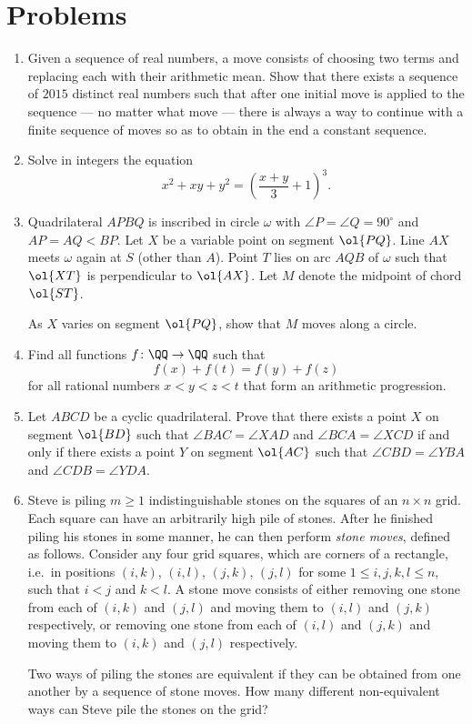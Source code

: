 \documentclass[11pt]{scrartcl}
\begin{document}
\section{Problems}
\begin{enumerate}[\bfseries 1.]
\item %
Given a sequence of real numbers,
a move consists of choosing two terms
and replacing each with their arithmetic mean.
Show that there exists a sequence of $2015$ distinct real numbers
such that after one initial move
is applied to the sequence --- no matter what move --- there
is always a way to continue with a finite sequence of moves
so as to obtain in the end a constant sequence.

\item %
Solve in integers the equation
\[ x^2+xy+y^2 = \left(\frac{x+y}{3}+1\right)^3. \]

\item %
Quadrilateral $APBQ$ is inscribed in circle $\omega$ with
$\angle P = \angle Q = 90^{\circ}$ and $AP = AQ < BP$.
Let $X$ be a variable point on segment $\ol{PQ}$.
Line $AX$ meets $\omega$ again at $S$ (other than $A$).
Point $T$ lies on arc $AQB$ of $\omega$ such that $\ol{XT}$
is perpendicular to $\ol{AX}$.
Let $M$ denote the midpoint of chord $\ol{ST}$.

As $X$ varies on segment $\ol{PQ}$, show that $M$ moves along a circle.

\item %
Find all functions $f \colon \QQ \to \QQ$ such that
\[ f(x)+f(t)=f(y)+f(z) \]
for all rational numbers $x<y<z<t$ that form an arithmetic progression.

\item %
Let $ABCD$ be a cyclic quadrilateral.
Prove that there exists a point $X$ on segment $\ol{BD}$
such that $\angle BAC=\angle XAD$ and $\angle BCA=\angle XCD$
if and only if there exists a point $Y$ on segment $\ol{AC}$
such that $\angle CBD=\angle YBA$ and $\angle CDB=\angle YDA$.

\item %
Steve is piling $m\geq 1$ indistinguishable stones
on the squares of an $n\times n$ grid.
Each square can have an arbitrarily high pile of stones.
After he finished piling his stones in some manner,
he can then perform \emph{stone moves}, defined as follows.
Consider any four grid squares, which are corners of a rectangle,
i.e.\ in positions $(i, k)$, $(i, l)$, $(j, k)$, $(j, l)$
for some $1\leq i, j, k, l\leq n$, such that $i<j$ and $k<l$.
A stone move consists of either removing one stone from each of
$(i, k)$ and $(j, l)$ and moving them to $(i, l)$ and $(j, k)$ respectively,
or removing one stone from each of $(i, l)$ and $(j, k)$
and moving them to $(i, k)$ and $(j, l)$ respectively.

Two ways of piling the stones are equivalent if they can be obtained
from one another by a sequence of stone moves.
How many different non-equivalent ways can Steve pile the stones on the grid?

\end{enumerate}
\pagebreak
\end{document}
